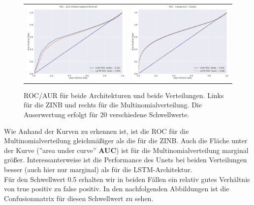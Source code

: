 \begin{figure}[h]
\begin{tabular}{cc}
\includegraphics[width=70mm]{abb/ROC_ZINFBINOM.png}&
\includegraphics[width=70mm]{abb/ROC_Categorical.png}
\end{tabular}
\caption{ROC/AUR für beide Architekturen und beide Verteilungen. Links für die ZINB und rechts für die Multinomialverteilung.
Die Auserwertung erfolgt für 20 verschiedene Schwellwerte. \label{fig:anomerz}}
\end{figure}

\noindent Wie Anhand der Kurven zu erkennen ist, ist die ROC für die Multinomialverteilung gleichmäßiger als die für die ZINB. 
Auch die Fläche unter der Kurve (''area under curve'' \textbf{AUC}) ist für die Multinomialverteilung marginal größer. Interessanterweise ist die Performance des Unets bei beiden Verteilungen besser (auch hier nur marginal) als für die LSTM-Architektur.\\

\noindent Für den Schwellwert 0.5 erhalten wir in beiden Fällen ein relativ gutes Verhältnis von true positiv zu false positiv. In den nachfolgenden Abbildungen ist die Confusionmatrix für diesen Schwellwert zu sehen.


